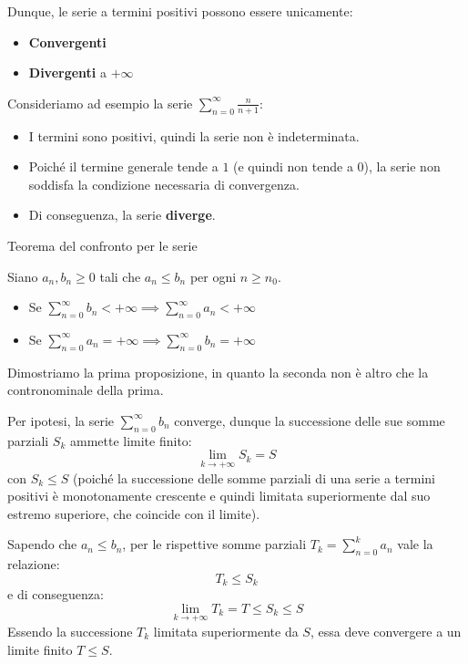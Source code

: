\documentclass[12pt]{report}
\begin{document}
	Dunque, le serie a termini positivi possono essere unicamente:
	\begin{itemize}
		
		\item \textbf{Convergenti}
		
		\item \textbf{Divergenti} a $+\infty$
		
	\end{itemize}
	
	Consideriamo ad esempio la serie $\sum_{n=0}^{\infty} \frac{n}{n+1}$:
	\begin{itemize}
		
		\item I termini sono positivi, quindi la serie non è indeterminata.
		
		\item Poiché il termine generale tende a $1$ (e quindi non tende a $0$), la serie non soddisfa la condizione necessaria di convergenza.
		
		\item Di conseguenza, la serie \textbf{diverge}.
		
	\end{itemize}
	
	\begin{teorema}{Teorema del confronto per le serie}{}
		
		Siano $a_n, b_n \geq 0$ tali che $a_n \leq b_n$ per ogni $n \geq n_0$.
		\begin{itemize}
			
			\item Se $\sum_{n=0}^{\infty} b_n < +\infty \implies \sum_{n=0}^{\infty} a_n < +\infty$
			
			\item Se $\sum_{n=0}^{\infty} a_n = +\infty \implies \sum_{n=0}^{\infty} b_n = +\infty$
			
		\end{itemize}
	\end{teorema}
	
	\begin{dimostrazione}{}{}
		
		Dimostriamo la prima proposizione, in quanto la seconda non è altro che la contronominale della prima.
		
		Per ipotesi, la serie $\sum_{n=0}^{\infty} b_n$ converge, dunque la successione delle sue somme parziali $S_k$ ammette limite finito:
		\[
		\lim_{k \to +\infty} S_k = S
		\]
		con $S_k \leq S$ (poiché la successione delle somme parziali di una serie a termini positivi è monotonamente crescente e quindi limitata superiormente dal suo estremo superiore, che coincide con il limite).
		
		Sapendo che $a_n \leq b_n$, per le rispettive somme parziali $T_k = \sum_{n=0}^{k} a_n$ vale la relazione:
		\[
		T_k \leq S_k
		\]
		e di conseguenza:
		\[
		\lim_{k \to +\infty} T_k = T \leq S_k \leq S
		\]
		Essendo la successione $T_k$ limitata superiormente da $S$, essa deve convergere a un limite finito $T \leq S$.
		
	\end{dimostrazione}
	
\end{document}
